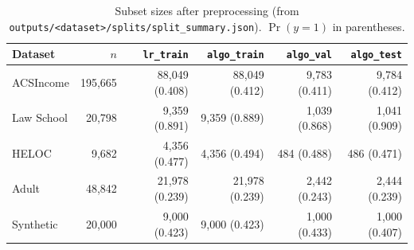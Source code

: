 \begin{table}[h]
\centering
\caption{Subset sizes after preprocessing (from \texttt{outputs/<dataset>/splits/split\_summary.json}). $\Pr(y{=}1)$ in parentheses.}
\label{tab:splits}
\small
\begin{tabular}{lrrrrr}
\toprule
Dataset & $n$ & \texttt{lr\_train} & \texttt{algo\_train} & \texttt{algo\_val} & \texttt{algo\_test} \\
\midrule
ACSIncome  & 195{,}665 & 88{,}049 (0.408) & 88{,}049 (0.412) & 9{,}783 (0.411) & 9{,}784 (0.412) \\
Law School &  20{,}798 &  9{,}359 (0.891) &  9{,}359 (0.889) & 1{,}039 (0.868) & 1{,}041 (0.909) \\
HELOC      &   9{,}682 &  4{,}356 (0.477) &  4{,}356 (0.494) &   484 (0.488) &   486 (0.471) \\
Adult      &  48{,}842 & 21{,}978 (0.239) & 21{,}978 (0.239) & 2{,}442 (0.243) & 2{,}444 (0.239) \\
Synthetic  &  20{,}000 &  9{,}000 (0.423) &  9{,}000 (0.423) & 1{,}000 (0.433) & 1{,}000 (0.407) \\
\bottomrule
\end{tabular}
\end{table}

